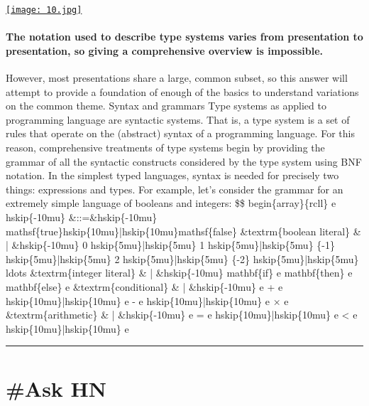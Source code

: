 \documentclass[10pt,a4paper]{article}
\begin{document}
\begin{minipage}[t]{0.80\linewidth}
\vspace{0pt}
\begin{multicols}{2}

    \href{https://langdev.stackexchange.com/questions/2692/how-should-i-read-type-system-notation?utm\_source=hackernewsletter\&utm\_medium=email\&utm\_term=fav}{
        \texttt{[image: 10.jpg]}
    }
  
\paragraph{The notation used to describe type systems varies from presentation to presentation, so giving a comprehensive overview is impossible.}
 However, most presentations share a large, common subset, so this answer will attempt to provide a foundation of enough of the basics to understand variations on the common theme.
Syntax and grammars
Type systems as applied to programming language are syntactic systems. That is, a type system is a set of rules that operate on the (abstract) syntax of a programming language. For this reason, comprehensive treatments of type systems begin by providing the grammar of all the syntactic constructs considered by the type system using BNF notation. In the simplest typed languages, syntax is needed for precisely two things: expressions and types.
For example, let’s consider the grammar for an extremely simple language of booleans and integers:
\$\$
begin\{array\}\{rcll\}
e hskip\{-10mu\}
\&::=\&hskip\{-10mu\} mathsf\{true\}hskip\{10mu\}|hskip\{10mu\}mathsf\{false\} \&textrm\{boolean literal\}
\& | \&hskip\{-10mu\} 0 hskip\{5mu\}|hskip\{5mu\} 1 hskip\{5mu\}|hskip\{5mu\} \{-1\} hskip\{5mu\}|hskip\{5mu\} 2 hskip\{5mu\}|hskip\{5mu\} \{-2\} hskip\{5mu\}|hskip\{5mu\} ldots \&textrm\{integer literal\}
\& | \&hskip\{-10mu\} mathbf\{if\} e mathbf\{then\} e mathbf\{else\} e \&textrm\{conditional\}
\& | \&hskip\{-10mu\} e + e hskip\{10mu\}|hskip\{10mu\} e - e hskip\{10mu\}|hskip\{10mu\} e × e \&textrm\{arithmetic\}
\& | \&hskip\{-10mu\} e = e hskip\{10mu\}|hskip\{10mu\} e < e hskip\{10mu\}|hskip\{10mu\} e

\end{multicols}
\end{minipage}
\par\medskip
\noindent\textcolor{red}{\rule{\linewidth}{0.2mm}}

\newpage
\section{\#Ask HN}
\end{document}
